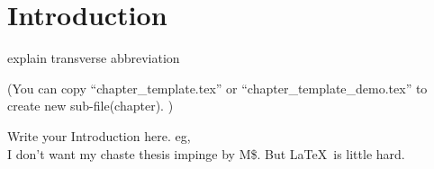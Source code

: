 \documentclass[class=NTHU_thesis, crop=false]{standalone}
\begin{document}
\chapter{Introduction}
explain transverse
abbreviation

(You can copy ``chapter\_template.tex'' or ``chapter\_template\_demo.tex'' to create new sub-file(chapter). )

Write your Introduction here.
eg, \\
I don't want my chaste thesis impinge by M\${}. But \LaTeX\ is little hard.
\end{document}
